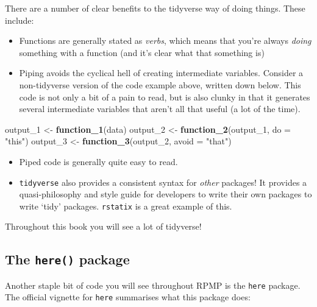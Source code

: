 \documentclass[
]{book}
\newenvironment{Shaded}{\begin{snugshade}}{\end{snugshade}}
\newcommand{\AttributeTok}[1]{\textcolor[rgb]{0.13,0.29,0.53}{#1}}
\newcommand{\FunctionTok}[1]{\textcolor[rgb]{0.13,0.29,0.53}{\textbf{#1}}}
\newcommand{\NormalTok}[1]{#1}
\newcommand{\OtherTok}[1]{\textcolor[rgb]{0.56,0.35,0.01}{#1}}
\newcommand{\StringTok}[1]{\textcolor[rgb]{0.31,0.60,0.02}{#1}}
\providecommand{\tightlist}{%
  \setlength{\itemsep}{0pt}\setlength{\parskip}{0pt}}
\begin{document}
There are a number of clear benefits to the tidyverse way of doing things. These include:

\begin{itemize}
\tightlist
\item
  Functions are generally stated as \emph{verbs}, which means that you're always \emph{doing} something with a function (and it's clear what that something is)
\item
  Piping avoids the cyclical hell of creating intermediate variables. Consider a non-tidyverse version of the code example above, written down below. This code is not only a bit of a pain to read, but is also clunky in that it generates several intermediate variables that aren't all that useful (a lot of the time).
\end{itemize}

\begin{Shaded}
\begin{Highlighting}[]
\NormalTok{output\_1 }\OtherTok{\textless{}{-}} \FunctionTok{function\_1}\NormalTok{(data)}
\NormalTok{output\_2 }\OtherTok{\textless{}{-}} \FunctionTok{function\_2}\NormalTok{(output\_1, }\AttributeTok{do =} \StringTok{"this"}\NormalTok{)}
\NormalTok{output\_3 }\OtherTok{\textless{}{-}} \FunctionTok{function\_3}\NormalTok{(output\_2, }\AttributeTok{avoid =} \StringTok{"that"}\NormalTok{)}
\end{Highlighting}
\end{Shaded}

\begin{itemize}
\tightlist
\item
  Piped code is generally quite easy to read.
\item
  \texttt{tidyverse} also provides a consistent syntax for \emph{other} packages! It provides a quasi-philosophy and style guide for developers to write their own packages to write `tidy' packages. \texttt{rstatix} is a great example of this.
\end{itemize}

Throughout this book you will see a lot of tidyverse!

\hypertarget{the-here-package}{%
\subsection{\texorpdfstring{The \texttt{here()} package}{The here() package}}\label{the-here-package}}

Another staple bit of code you will see throughout RPMP is the \texttt{here} package. The official vignette for \texttt{here} summarises what this package does:
\end{document}
